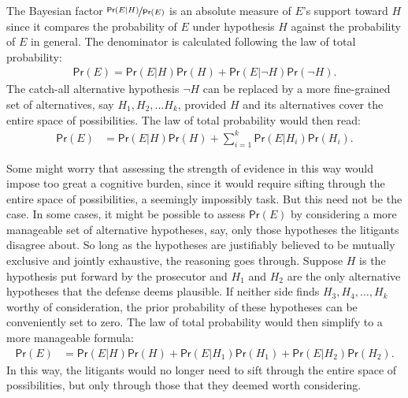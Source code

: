 \documentclass{article}
\newcommand{\pr}{\mathsf{Pr}}
\begin{document}
The Bayesian factor $\nicefrac{\pr(E \vert H)}{\pr(E)}$
is an absolute measure of $E$'s support toward $H$ since it compares the probability of $E$ under hypothesis $H$ against the probability of $E$ in general. 
The denominator is calculated following the law of total probability:
%
\begin{align*}\pr(E)= \pr(E \vert H) \pr(H)+\pr(E \vert \neg H) \pr(\neg H).\end{align*}
%
The catch-all alternative hypothesis $\neg H$ can be replaced by a more fine-grained set of alternatives, say $H_1, H_2, \dots H_k$, provided $H$ and its alternatives cover the entire space of possibilities. The law of total probability would then read:
%
\begin{align*}
\pr(E) & = \pr(E\vert H)\pr(H) +\sum_{i=1}^k \pr(E\vert H_i)\pr(H_i). 
\end{align*}

Some might worry that assessing 
the strength of evidence in this way would impose too great a cognitive  burden, since it would require sifting through the entire space of possibilities, a seemingly impossibly task. 
But this need not be the case. In some cases, it might be possible to assess 
$\pr(E)$ by considering a more manageable 
set of alternative hypotheses, say, only those hypotheses the litigants disagree about. So long as the hypotheses are justifiably believed to be mutually exclusive and jointly exhaustive, the reasoning goes through. Suppose $H$ is the hypothesis put forward by the prosecutor and $H_1$ and $H_2$ are the only alternative hypotheses that the defense deems plausible. If neither side finds $H_3, H_4, \dots, H_k$ worthy of  consideration, the prior probability of these hypotheses can be conveniently set to zero. The law of total probability would then simplify to a more manageable formula:
%
\begin{align*}
\pr(E) & = \pr(E\vert H)\pr(H) + \pr(E\vert H_1)\pr(H_1) + \pr(E\vert H_2)\pr(H_2).%
\end{align*}
%
In this way, the litigants would no longer need to sift through the entire space of possibilities,  but only through those that they deemed worth considering. 

%
\end{document}
